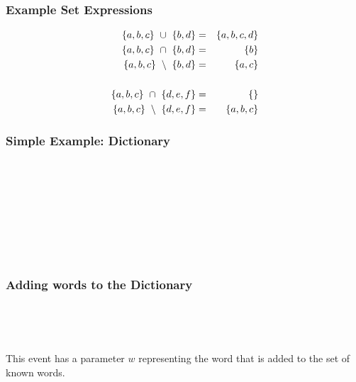 \documentclass{beamer}
\begin{document}
\begin{frame}


\frametitle{Example Set Expressions}

\begin{eqnarray*}
\{a,b,c\} ~\cup~ \{b,d\} &=& \{a,b,c,d\} \\
\{a,b,c\} ~\cap~ \{b,d\} &=& \{b\} \\
\{a,b,c\} ~\setminus~ \{b,d\} &=& \{a,c\} \\
~\\
\{a,b,c\} ~\cap~ \{d,e,f\} &=& \{\} \\
\{a,b,c\} ~\setminus~ \{d,e,f\}  &=& \{a,b,c\}  \\
\end{eqnarray*}




\end{frame}







\begin{frame}


\frametitle{Simple Example: Dictionary }

\ENDC\\

~

~


~


~



\end{frame}




\begin{frame}

\frametitle{Adding  words to the Dictionary }

\operations
{}

~

~

This event has a \alert{parameter} $w$ representing the word that is added to the set of known words.

\end{frame}
\end{document}
